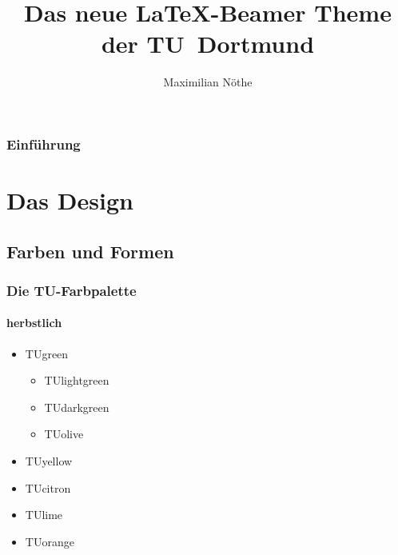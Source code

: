 \documentclass[t]{beamer}
\title{Das neue \LaTeX-Beamer Theme der TU~Dortmund}
\author{Maximilian Nöthe}
\institute[Lehrstuhl E5b \\ Fakultät Physik]{Lehrstuhl E5b \par\vspace{3pt} Fakultät Physik}
\begin{document}
\begin{frame}
\setcounter{framenumber}{0}
    \titlepage
\end{frame}

\begin{frame}
    \frametitle{Einführung}
    \tableofcontents[pausesections]
\end{frame}

\section{Das Design}
\subsection{Farben und Formen}
\begin{frame}
    \frametitle{Die TU-Farbpalette}
    \framesubtitle{herbstlich}
    \begin{itemize}
        \item \textcolor{TUgreen}{TUgreen}
            \begin{itemize}
                \item \textcolor{TUlightgreen}{TUlightgreen}
                \item \textcolor{TUdarkgreen}{TUdarkgreen}
                \item \textcolor{TUolive}{TUolive}
            \end{itemize}
        \item \textcolor{TUyellow}{TUyellow}
        \item \textcolor{TUcitron}{TUcitron}
        \item \textcolor{TUlime}{TUlime}
        \item \textcolor{TUorange}{TUorange}
    \end{itemize}
\end{frame}
\end{document}
